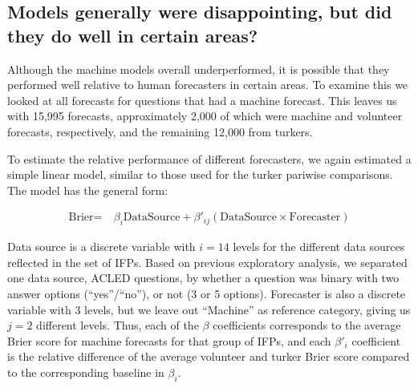 \documentclass[]{article}
\begin{document}
\subsection{Models generally were disappointing, but did they do well in
certain
areas?}\label{models-generally-were-disappointing-but-did-they-do-well-in-certain-areas}

Although the machine models overall underperformed, it is possible that
they performed well relative to human forecasters in certain areas. To
examine this we looked at all forecasts for questions that had a machine
forecast. This leaves us with 15,995 forecasts, approximately 2,000 of
which were machine and volunteer forecasts, respectively, and the
remaining 12,000 from turkers.

To estimate the relative performance of different forecasters, we again
estimated a simple linear model, similar to those used for the turker
pariwise comparisons. The model has the general form:

\[
\begin{aligned}
\textrm{Brier} =~& \beta_{i}\textrm{DataSource} + \beta'_{ij}(\textrm{DataSource}\times\textrm{Forecaster})
\end{aligned}
\]

Data source is a discrete variable with \(i=14\) levels for the
different data sources reflected in the set of IFPs. Based on previous
exploratory analysis, we separated one data source, ACLED questions, by
whether a question was binary with two answer options (``yes''/``no''),
or not (3 or 5 options). Forecaster is also a discrete variable with 3
levels, but we leave out ``Machine'' as reference category, giving us
\(j=2\) different levels. Thus, each of the \(\beta\) coefficients
corresponds to the average Brier score for machine forecasts for that
group of IFPs, and each \(\beta'_i\) coefficient is the relative
difference of the average volunteer and turker Brier score compared to
the corresponding baseline in \(\beta_i\).
\end{document}
